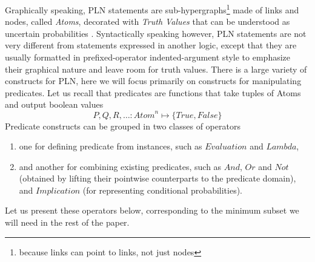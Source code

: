 \documentclass[runningheads]{llncs}
\newcommand{\TTrue}{\textit{True}}
\newcommand{\TFalse}{\textit{False}}
\newcommand{\TAtom}{\textit{Atom}}
\newcommand{\TEval}{\textit{Evaluation}}
\newcommand{\TLamb}{\textit{Lambda}}
\newcommand{\TAnd}{\textit{And}}
\newcommand{\TOr}{\textit{Or}}
\newcommand{\TNot}{\textit{Not}}
\newcommand{\TImpl}{\textit{Implication}}
\begin{document}
Graphically speaking, PLN statements are
sub-hypergraphs\footnote{because links can point to links, not just
nodes} made of links and nodes, called \emph{Atoms}, decorated with
\emph{Truth Values} that can be understood as uncertain probabilities
\cite{TODO}.  Syntactically speaking however, PLN statements are not
very different from statements expressed in another logic, except that
they are usually formatted in prefixed-operator indented-argument
style to emphasize their graphical nature and leave room for truth
values.  There is a large variety of constructs for PLN, here we will
focus primarily on constructs for manipulating predicates.  Let us
recall that predicates are functions that take tuples of Atoms and
output boolean values
$$P, Q, R, \hdots: \TAtom^n \mapsto \{\TTrue, \TFalse\}$$
Predicate constructs can be grouped in two classes of operators
\begin{enumerate}
\item one for defining predicate from instances, such as $\TEval$ and
  $\TLamb$,
\item and another for combining existing predicates, such as $\TAnd$,
  $\TOr$ and $\TNot$ (obtained by lifting their pointwise counterparts
  to the predicate domain), and $\TImpl$ (for representing conditional
  probabilities).
\end{enumerate}
Let us present these operators below, corresponding to the minimum
subset we will need in the rest of the paper.
\end{document}
